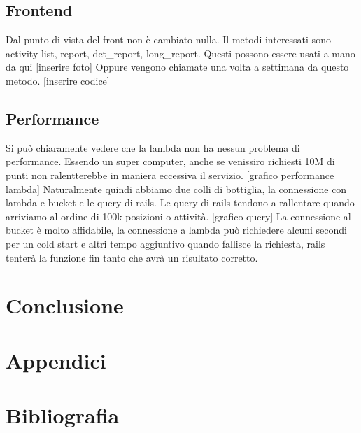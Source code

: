 \documentclass[12pt]{article}
\begin{document}
\subsection{Frontend}
Dal punto di vista del front non è cambiato nulla. Il metodi interessati sono 
activity list, report, det_report, long_report. Questi possono essere usati 
a mano da qui 
[inserire foto]
Oppure vengono chiamate una volta a settimana da questo metodo. 
[inserire codice]
\subsection{Performance}
Si può chiaramente vedere che la lambda non ha nessun problema di performance.
Essendo un super computer, anche se venissiro richiesti 10M di punti non ralentterebbe 
in maniera eccessiva il servizio. 
[grafico performance lambda]
Naturalmente quindi abbiamo due colli di bottiglia, la connessione con lambda e 
bucket e le query di rails. Le query di rails tendono a rallentare quando arriviamo 
al ordine di 100k posizioni o attività. 
[grafico query]
La connessione al bucket è molto affidabile, la connessione a lambda può richiedere 
alcuni secondi per un cold start e altri tempo aggiuntivo quando fallisce la richiesta, 
rails tenterà la funzione fin tanto che avrà un risultato corretto. 
\section{Conclusione}
\section{Appendici}
\section{Bibliografia}
\end{document}
